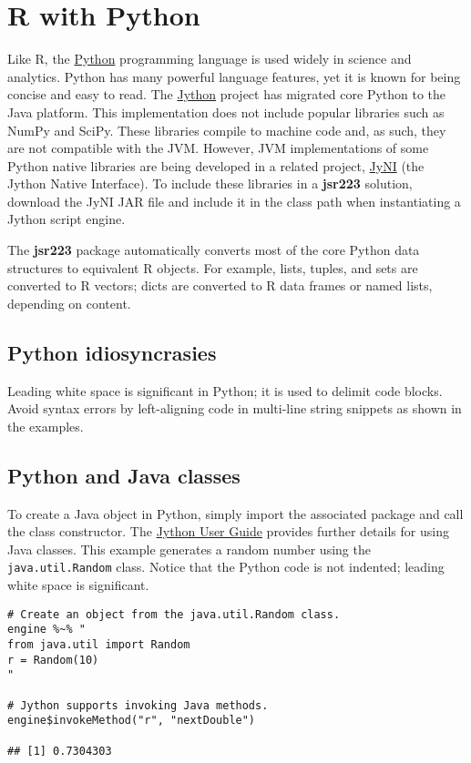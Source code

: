 \documentclass[
article,
11pt, %
a4paper, %
oneside, %
headinclude,footinclude, %
]{scrartcl}
\theoremstyle{definition} %
\theoremstyle{plain} %
\theoremstyle{remark} %
\newcommand{\pkg}[1]{\textbf{#1}}
\newcommand{\code}[1]{\texttt{#1}}
\begin{document}
\hypertarget{r-with-python}{}
\section{R with Python}

Like R, the \href{https://www.python.org/}{Python} programming language is used widely in science and analytics. Python has many powerful language features, yet it is known for being concise and easy to read. The \href{http://www.jython.org/}{Jython} project has migrated core Python to the Java platform. This implementation does not include popular libraries such as NumPy and SciPy. These libraries compile to machine code and, as such, they are not compatible with the JVM. However, JVM implementations of some Python native libraries are being developed in a related project, \href{http://www.jyni.org/}{JyNI} (the Jython Native Interface). To include these libraries in a \pkg{jsr223} solution, download the JyNI JAR file and include it in the class path when instantiating a Jython script engine.

The \pkg{jsr223} package automatically converts most of the core Python data structures to equivalent R objects. For example, lists, tuples, and sets are converted to R vectors; dicts are converted to R data frames or named lists, depending on content.

\subsection{Python idiosyncrasies}

Leading white space is significant in Python; it is used to delimit code blocks. Avoid syntax errors by left-aligning code in multi-line string snippets as shown in the examples.

\subsection{Python and Java classes}

To create a Java object in Python, simply import the associated package and call the class constructor. The \href{https://wiki.python.org/jython/NewUsersGuide}{Jython User Guide} provides further details for using Java classes. This example generates a random number using the \code{java.util.Random} class. Notice that the Python code is not indented; leading white space is significant.

\begin{verbatim}
# Create an object from the java.util.Random class.
engine %~% "
from java.util import Random
r = Random(10)
"

# Jython supports invoking Java methods.
engine$invokeMethod("r", "nextDouble")

## [1] 0.7304303
\end{verbatim}
\end{document}
